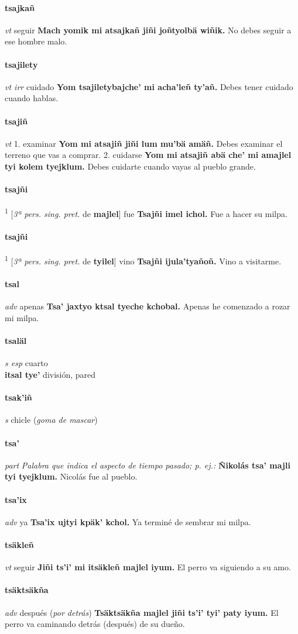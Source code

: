 \documentclass{scrbook}
\newcommand{\entry}[1]{\paragraph{#1}}
\newcommand{\onedefinition}[1]{#1.}
\newcommand{\defsuperscript}[1]{\textsuperscript{1}}
\newcommand{\nontranslationdef}[1]{\textit{#1}}
\newcommand{\partofspeech}[1]{\textit{#1}}
\newcommand{\spanishtranslation}[1]{#1}
\newcommand{\clarification}[1]{(\textit{#1})}
\newcommand{\cholexample}[1]{\textbf{#1}}
\newcommand{\exampletranslation}[1]{#1}
\newcommand{\secondaryentry}[1]{\\\textbf{#1}}
\newcommand{\secondtranslation}[1]{#1}
\newcommand{\conjugationtense}[1]{[\textit{#1}}
\newcommand{\conjugationverb}[1]{de \textbf{#1}]}
\begin{document}
\begin{multicols}{2}
\entry{tsajkañ}
\partofspeech{vt}
\spanishtranslation{seguir}
\cholexample{Mach yomik mi atsajkañ jiñi joñtyolbä wiñik.}
\exampletranslation{No debes seguir a ese hombre malo.}

\entry{tsajilety}
\partofspeech{vt irr}
\spanishtranslation{cuidado}
\cholexample{Yom tsajiletybajche' mi acha'leñ ty'añ.}
\exampletranslation{Debes tener cuidado cuando hablas.}

\entry{tsajiñ}
\partofspeech{vt}
\onedefinition{1}
\spanishtranslation{examinar}
\cholexample{Yom mi atsajiñ jiñi lum mu'bä amäñ.}
\exampletranslation{Debes examinar el terreno que vas a comprar.}
\onedefinition{2}
\spanishtranslation{cuidarse}
\cholexample{Yom mi atsajiñ abä che' mi amajlel tyi kolem tyejklum.}
\exampletranslation{Debes cuidarte cuando vayas al pueblo grande.}

\entry{tsajñi}
\defsuperscript{1}
\conjugationtense{3ª pers. sing. pret.}
\conjugationverb{majlel}
\spanishtranslation{fue}
\cholexample{Tsajñi imel ichol.}
\exampletranslation{Fue a hacer su milpa.}

\entry{tsajñi}
\defsuperscript{2}
\conjugationtense{3ª pers. sing. pret.}
\conjugationverb{tyilel}
\spanishtranslation{vino}
\cholexample{Tsajñi ijula'tyañoñ.}
\exampletranslation{Vino a visitarme.}

\entry{tsal}
\partofspeech{adv}
\spanishtranslation{apenas}
\cholexample{Tsa' jaxtyo ktsal tyeche kchobal.}
\exampletranslation{Apenas he comenzado a rozar mi milpa.}

\entry{tsaläl}
\partofspeech{s esp}
\spanishtranslation{cuarto}
\secondaryentry{itsal tye'}
\secondtranslation{división, pared}

\entry{tsak'iñ}
\partofspeech{s}
\spanishtranslation{chicle}
\clarification{goma de mascar}

\entry{tsa'}
\partofspeech{part}
\nontranslationdef{Palabra que indica el aspecto de tiempo pasado; p. ej.:}
\cholexample{Ñikolás tsa' majli tyi tyejklum.}
\exampletranslation{Nicolás fue al pueblo.}

\entry{tsa'ix}
\partofspeech{adv}
\spanishtranslation{ya}
\cholexample{Tsa'ix ujtyi kpäk' kchol.}
\exampletranslation{Ya terminé de sembrar mi milpa.}

\entry{tsäkleñ}
\partofspeech{vt}
\spanishtranslation{seguir}
\cholexample{Jiñi ts'i' mi itsäkleñ majlel iyum.}
\exampletranslation{El perro va siguiendo a su amo.}

\entry{tsäktsäkña}
\partofspeech{adv}
\spanishtranslation{después}
\clarification{por detrás}
\cholexample{Tsäktsäkña majlel jiñi ts'i' tyi' paty iyum.}
\exampletranslation{El perro va caminando detrás (después) de su dueño.}


\end{multicols}
\end{document}
